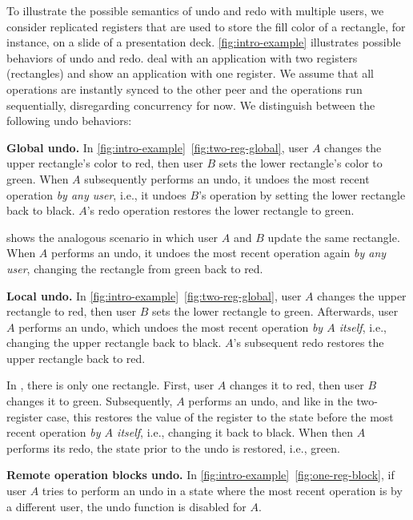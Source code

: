 \documentclass[sigplan,natbib=false,review]{acmart}
\begin{document}
To illustrate the possible semantics of undo and redo with multiple users,
we consider replicated registers that are used to store the fill color
of a rectangle, for instance, on a slide of a presentation deck.
\cref{fig:intro-example} illustrates possible behaviors of undo and redo.
 deal with an application 
with two registers (rectangles) and
 show an
application with one register. 
We assume that all operations are instantly synced to the other peer and the
operations run sequentially, disregarding concurrency for now.
We distinguish between the following undo behaviors:

\textbf{Global undo.}
In \cref{fig:intro-example}~\ref{fig:two-reg-global},
user $A$ changes the upper rectangle's color
to red, then user $B$ sets the lower rectangle's color to green.
When $A$ subsequently performs an undo, it undoes the most recent operation
\emph{by any user}, i.e., it undoes $B$'s operation by setting the lower
rectangle back to black.
$A$'s redo operation restores the lower rectangle to green.

 shows the analogous scenario in which user $A$
and $B$ update the same rectangle.
When $A$ performs an undo, it undoes the most recent operation
again \emph{by any user}, changing the rectangle from green back to red.

\textbf{Local undo.}
In \cref{fig:intro-example}~\ref{fig:two-reg-global},
user $A$ changes the upper rectangle to red,
then user $B$ sets the lower rectangle to green.
Afterwards, user $A$ performs an undo, which undoes the most recent operation
\emph{by $A$ itself}, i.e., changing the upper rectangle back to black.
$A$'s subsequent redo restores the upper rectangle back to red.

In , there is only one rectangle.
First, user $A$ changes it to red, then user $B$ changes it to green.
Subsequently, $A$ performs an undo, and like in the two-register case, this
restores the value of the register to the state before the most recent operation
\emph{by $A$ itself}, i.e., changing it back to black.
When then $A$ performs its redo, the state prior to the undo is restored, i.e.,
green.

\textbf{Remote operation blocks undo.}
In \cref{fig:intro-example}~\ref{fig:one-reg-block}, if user $A$ tries to
perform an undo in a state where the most recent operation is by a different user,
the undo function is disabled for $A$.
\end{document}
